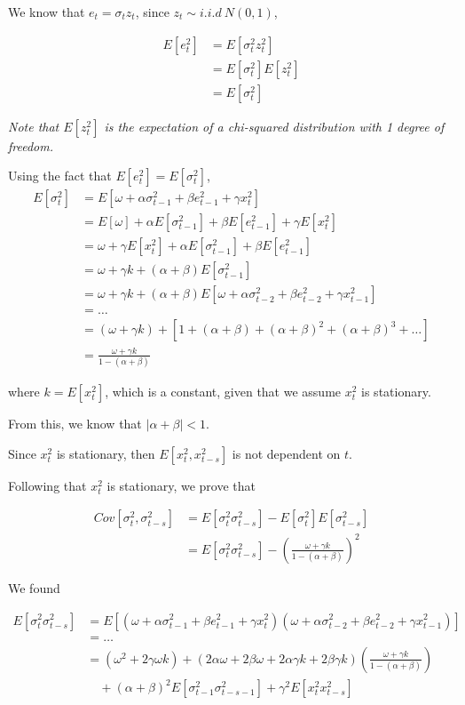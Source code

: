 \documentclass{article}
\begin{document}
We know that $e_t = \sigma_t z_t$, since $z_t \sim i.i.d \ N(0,1)$,

\[
\begin{split}
E[e_t^2] &= E[\sigma_t^2 z_t^2] \\
&= E[\sigma_t^2] E[z_t^2] \\
&= E[\sigma_t^2]
\end{split}
\]

\textit{Note that $E[z_t^2]$ is the expectation of a chi-squared distribution with 1 degree of freedom.}

Using the fact that $E[e_t^2] = E[\sigma_t^2]$,
\[
\begin{split}
    E[\sigma_t^2] &= E[\omega + \alpha \sigma_{t-1}^2 + \beta e_{t-1}^2 + \gamma x_t^2] \\
    &= E[\omega] + \alpha E[\sigma_{t-1}^2] + \beta E[e_{t-1}^2] + \gamma E[x_t^2] \\
    &= \omega + \gamma E[x_t^2] + \alpha E[\sigma_{t-1}^2] + \beta E[e_{t-1}^2] \\
    &= \omega + \gamma k + (\alpha + \beta) E[\sigma_{t-1}^2] \\
    &= \omega + \gamma k + (\alpha + \beta) E[\omega + \alpha \sigma_{t-2}^2 + \beta e_{t-2}^2 + \gamma x_{t-1}^2] \\
    &= \ldots \\
    &= (\omega + \gamma k) + [1+ (\alpha + \beta) + (\alpha + \beta)^2 + (\alpha + \beta)^3 + \ldots] \\
    &= \frac{\omega + \gamma k}{1-(\alpha+\beta)}
\end{split}
\]

where $k = E[x_t^2]$, which is a constant, given that we assume $x_t^2$ is stationary.

From this, we know that $|\alpha + \beta| < 1$.

Since $x_t^2$ is stationary, then $E[x_t^2, x_{t-s}^2]$ is not dependent on $t$.

Following that $x_t^2$ is stationary, we prove that

\[
\begin{split}
Cov[\sigma_t^2,\sigma_{t-s}^2] &= E[\sigma_t^2 \sigma_{t-s}^2] - E[\sigma_t^2]E[\sigma_{t-s}^2] \\
&= E[\sigma_t^2 \sigma_{t-s}^2] - \left(\frac{\omega + \gamma k}{1-(\alpha+\beta)}\right)^2
\end{split}
\]

We found 

\[
\begin{split}
E[\sigma_t^2 \sigma_{t-s}^2] &= E[(\omega + \alpha \sigma_{t-1}^2 + \beta e_{t-1}^2 + \gamma x_t^2)(\omega + \alpha \sigma_{t-2}^2 + \beta e_{t-2}^2 + \gamma x_{t-1}^2)] \\
&= \ldots \\
&= (\omega^2 + 2\gamma \omega k) + (2 \alpha \omega + 2 \beta \omega + 2 \alpha \gamma k + 2 \beta \gamma k) \left(\frac{\omega + \gamma k}{1-(\alpha+\beta)}\right) \\
&\quad + (\alpha + \beta)^2 E[\sigma_{t-1}^2 \sigma_{t-s-1}^2] + \gamma^2 E[x_t^2 x_{t-s}^2]
\end{split}
\]
\end{document}
